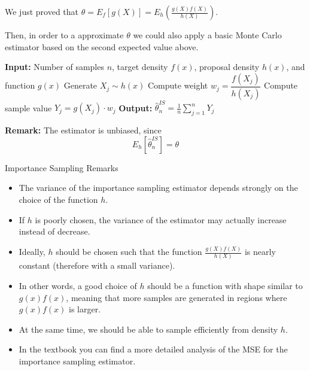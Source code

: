 \documentclass[8pt]{beamer}
\begin{document}
\begin{frame}
We just proved that $\theta =\displaystyle{ E_f[g(X)]= E_h \left( \frac{g(X) f(X)}{h(X)}\right)}$. 

Then, in order to a approximate $\theta$ we could also apply a basic Monte Carlo estimator based on the second expected value above.

\begin{algorithm}[H]
\caption{Monte Carlo Estimation via Importance Sampling}\label{alg:importance-sampling}
\begin{algorithmic}[1]
  \State \textbf{Input:} Number of samples $n$, target density $f(x)$, proposal density $h(x)$, and function $g(x)$
    \State Generate $X_j \sim h(x)$
    \State Compute weight $w_j = \dfrac{f(X_j)}{h(X_j)}$
    \State Compute sample value $Y_j = g(X_j) \cdot w_j$
  \EndFor
  \State \textbf{Output:} $\hat{\theta}_n^{IS} = \frac{1}{n} \sum_{j=1}^n Y_j$
\end{algorithmic}
\end{algorithm}

\textbf{Remark:} The estimator is unbiased, since 
$$ E_h[\hat{\theta}_n^{IS}] = \theta $$
\end{frame}

\begin{frame}{Importance Sampling Remarks}
\begin{itemize}
	\item The variance of the importance sampling estimator depends strongly on the choice of the function $h$. 
	\item If $h$ is poorly chosen, the variance of the estimator may actually increase instead of decrease. 	
	\item Ideally, $h$ should be chosen such that the function $\frac{g(X) f(X)}{h(X)}$ is nearly constant (therefore with a small variance).
	\item In other words, a good choice of $h$ should be a function with shape similar to $g(x)f(x)$, meaning that more samples are generated in regions where $g(x)f(x)$ is larger.
	\item At the same time, we should be able to sample efficiently from density $h$.
	\item In the textbook you can find a more detailed analysis  of the MSE for the importance sampling estimator.
\end{itemize} 
\end{frame} 
\end{document}
